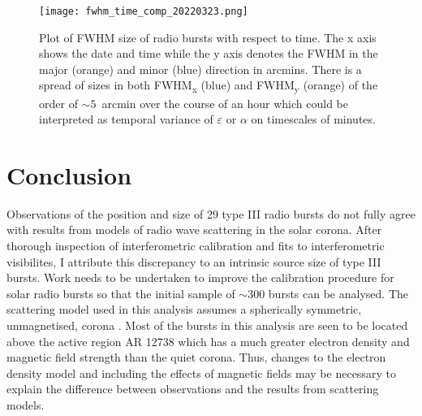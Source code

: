 \begin{figure}
\centering
\texttt{[image: fwhm\_time\_comp\_20220323.png]}
\caption[Plot of FWHM size of radio bursts with respect to time.]{Plot of FWHM size of radio bursts with respect to time. The x axis shows the date and time while the y axis denotes the FWHM in the major  (orange) and minor (blue) direction in arcmins. There is a spread of sizes in both FWHM\textsubscript{x} (blue) and FWHM\textsubscript{y} (orange) of the order of $\sim 5$~arcmin over the course of an hour which could be interpreted as temporal variance of $\varepsilon$ or $\alpha$ on timescales of minutes.}
\label{fig:fwhm_time_comp}
\end{figure}



\section{Conclusion}
Observations of the position and size of 29 type III radio bursts do not fully agree with results from models of radio wave scattering in the solar corona. After thorough inspection of interferometric calibration and fits to interferometric visibilites, I attribute this discrepancy to an intrinsic source size of type III bursts. Work needs to be undertaken to improve the calibration procedure for solar radio bursts so that the initial sample of $\sim 300$ bursts can be analysed. 
The scattering model used in this analysis assumes a spherically symmetric, unmagnetised, corona \citep{Kontar2019, Zhang2021}. Most of the bursts in this analysis are seen to be located above the active region AR 12738 which has a much greater electron density and magnetic field strength than the quiet corona. Thus, changes to the electron density model and including the effects of magnetic fields may be necessary to explain the difference between observations and the results from scattering models.

